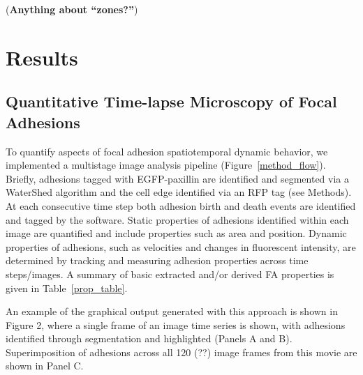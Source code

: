 \documentclass[10pt]{article}
\begin{document}
(\textbf{Anything about ``zones?''})


\section*{Results}


\subsection*{Quantitative Time-lapse Microscopy of Focal Adhesions}

To quantify aspects of focal adhesion spatiotemporal dynamic behavior, we
implemented a multistage image analysis pipeline (Figure~\ref{method_flow}).
Briefly, adhesions tagged with EGFP-paxillin are identified and segmented via a
WaterShed algorithm and the cell edge identified via an RFP tag (see Methods).
At each consecutive time step both adhesion birth and death events are
identified and tagged by the software. Static properties of adhesions identified
within each image are quantified and include properties such as area and
position. Dynamic properties of adhesions, such as velocities and changes in
fluorescent intensity, are determined by tracking and measuring adhesion
properties across time steps/images. A summary of basic extracted and/or derived
FA properties is given in Table~\ref{prop_table}.

An example of the graphical output generated with this approach is shown in
Figure 2, where a single frame of an image time series is shown, with adhesions
identified through segmentation and highlighted (Panels A and B).
Superimposition of adhesions across all 120 (??) image frames from this movie
are shown in Panel C.     
\end{document}
